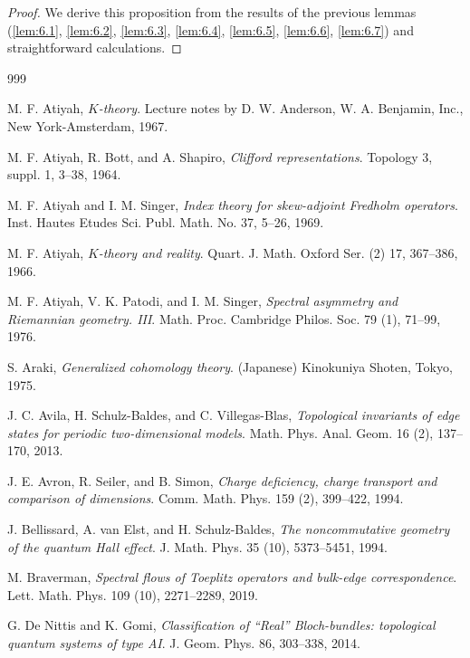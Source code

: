 \documentclass{amsart}
\theoremstyle{definition}
\theoremstyle{remark}
\begin{document}
\begin{proof}
We derive this proposition from the results of the previous lemmas (\ref{lem:6.1}, \ref{lem:6.2}, \ref{lem:6.3}, \ref{lem:6.4}, \ref{lem:6.5}, \ref{lem:6.6}, \ref{lem:6.7}) and straightforward calculations.
\end{proof}




\begin{thebibliography}{999}

M. F. Atiyah, 
\textit{$K$-theory}. 
Lecture notes by D. W. Anderson, W. A. Benjamin, Inc., New York-Amsterdam, 1967.

M. F. Atiyah, R. Bott, and A. Shapiro,
\textit{Clifford representations}. 
Topology 3, suppl. 1, 3--38, 1964.

M. F. Atiyah and I. M. Singer,
\textit{Index theory for skew-adjoint Fredholm operators}. 
Inst. Hautes Etudes Sci. Publ. Math. No. 37, 5--26, 1969.

M. F. Atiyah,
\textit{$K$-theory and reality}.
Quart. J. Math. Oxford Ser. (2) 17, 367--386, 1966.

M. F. Atiyah, V. K. Patodi, and I. M. Singer,
\textit{Spectral asymmetry and Riemannian geometry. III}.
Math. Proc. Cambridge Philos. Soc. 79 (1), 71--99, 1976.

S. Araki,
\textit{Generalized cohomology theory}. (Japanese) 
Kinokuniya Shoten, Tokyo, 1975.

J. C. Avila, H. Schulz-Baldes, and C. Villegas-Blas,
\textit{Topological invariants of edge states for periodic two-dimensional models}.
Math. Phys. Anal. Geom. 16 (2), 137--170, 2013.

J. E. Avron, R. Seiler, and B. Simon,
\textit{Charge deficiency, charge transport and comparison of dimensions}.
Comm. Math. Phys. 159 (2), 399--422, 1994.

J. Bellissard, A. van Elst, and H. Schulz-Baldes,
\textit{The noncommutative geometry of the quantum Hall effect}.
J. Math. Phys. 35 (10), 5373--5451, 1994.

M. Braverman,
\textit{Spectral flows of Toeplitz operators and bulk-edge correspondence}.
Lett. Math. Phys. 109 (10), 2271--2289, 2019.

G. De Nittis and K. Gomi,
\textit{Classification of ``Real'' Bloch-bundles: topological quantum systems of type AI}.
J. Geom. Phys. 86, 303--338, 2014.


\end{thebibliography}
\end{document}
